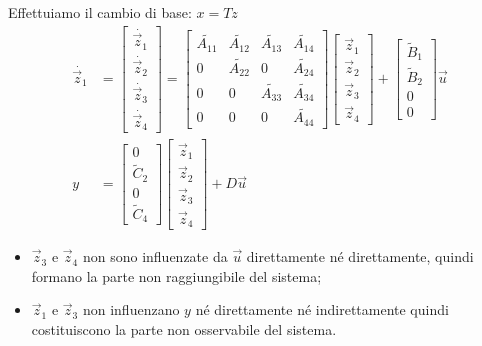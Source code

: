 \documentclass[../main.tex]{subfiles}
\begin{document}
		Effettuiamo il cambio di base: $ x = Tz $
		\begin{align*}
			\dot{\vec z_1} &=
			\begin{bmatrix}
				\dot{\vec z_1}\\
				\dot{\vec z_2}\\
				\dot{\vec z_3}\\
				\dot{\vec z_4}
			\end{bmatrix} =
			\begin{bmatrix}
				\tilde{A_{11}} & \tilde{A_{12}} & \tilde{A_{13}} & \tilde{A_{14}}\\
				0 & \tilde{A_{22}} & 0 & \tilde{A_{24}}\\
				0 & 0 & \tilde{A_{33}} & \tilde{A_{34}}\\
				0 & 0 & 0 & \tilde{A_{44}}
			\end{bmatrix}
			\begin{bmatrix}
				\vec z_1\\
				\vec z_2\\
				\vec z_3\\
				\vec z_4
			\end{bmatrix} +
			\begin{bmatrix}
				\tilde B_1\\
				\tilde B_2\\
				0\\
				0
			\end{bmatrix} \vec u
			\\
			y &=
			\begin{bmatrix}
				0\\
				\tilde C_2\\
				0\\
				\tilde C_4
			\end{bmatrix}
			\begin{bmatrix}
				\vec z_1\\
				\vec z_2\\
				\vec z_3\\
				\vec z_4
			\end{bmatrix} + D \vec u
		\end{align*}
		\begin{itemize}
			\item 
				$ \vec z_3 $ e $ \vec z_4 $ non sono influenzate da $ \vec u $ direttamente n\'e direttamente, quindi formano la parte non raggiungibile del sistema;
			\item 
				$ \vec z_1 $ e $ \vec z_3 $ non influenzano $ y $ n\'e direttamente n\'e indirettamente quindi costituiscono la parte non osservabile del sistema.
		\end{itemize}
	
\end{document}
